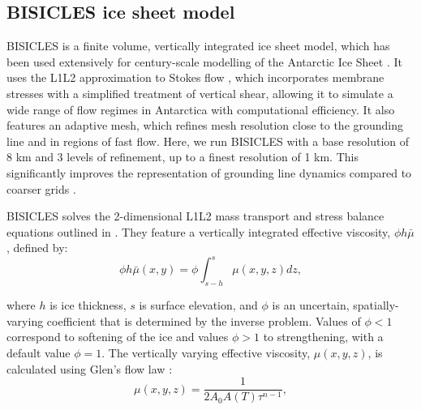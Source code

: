 \documentclass[journal abbreviation, manuscript]{copernicus}
\begin{document}
\subsection{BISICLES ice sheet model}

BISICLES \citep{cornfordAdaptiveMeshFinite2013} is a finite volume, vertically integrated ice sheet model, which has been used extensively for century-scale modelling of the Antarctic Ice Sheet \citep{cornfordCenturyscaleSimulationsResponse2015,niasAssessingUncertaintyDynamical2019,sunAntarcticIceSheet2020,werneckeQuantifyingImpactBedrock2022,siahaanAntarcticContribution21stcentury2022,oneillISMIP6basedAntarcticProjections2025}. It uses the L1L2 approximation to Stokes flow \citep{schoofThinFilmFlowsWall2010}, which incorporates membrane stresses with a simplified treatment of vertical shear, allowing it to simulate a wide range of flow regimes in Antarctica with computational efficiency. It also features an adaptive mesh, which refines mesh resolution close to the grounding line and in regions of fast flow. Here, we run BISICLES with a base resolution of 8 km and 3 levels of refinement, up to a finest resolution of 1 km. This significantly improves the representation of grounding line dynamics compared to coarser grids \citep{cornfordAdaptiveMeshRefinement2016}.

BISICLES solves the 2-dimensional L1L2 mass transport and stress balance equations outlined in \citet{cornfordCenturyscaleSimulationsResponse2015}. They feature a vertically integrated effective viscosity, $\phi h \bar{\mu}$, defined by:
\begin{equation}
    \phi h \bar{\mu}(x, y) = \phi \int_{s-h}^{s} \mu(x, y, z) dz,
\end{equation}

\noindent where $h$ is ice thickness, $s$ is surface elevation, and $\phi$ is an uncertain, spatially-varying coefficient that is determined by the inverse problem. Values of $\phi < 1$ correspond to softening of the ice and values $\phi > 1$ to strengthening, with a default value $\phi = 1$. The vertically varying effective viscosity, $\mu(x, y, z)$,  is calculated using Glen's flow law \citep{glenCreepPolycrystallineIce1955}:
\begin{equation}
    \mu(x, y, z) = \frac{1}{2 A_0 A(T) \tau^{n-1}},
\end{equation}
\end{document}
